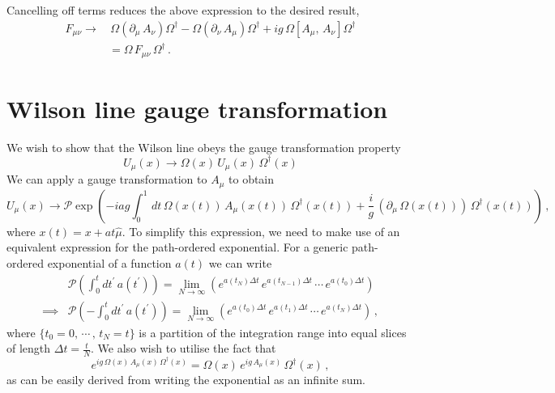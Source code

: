 Cancelling off terms reduces the above expression to the desired result,
%
\begin{align*}
F_{\mu\nu} \rightarrow &\, \Omega\left(\partial_\mu\,A_\nu\right)\Omega^\dagger - \Omega\left(\partial_\nu\,A_\mu\right)\Omega^\dagger +ig\,\Omega\left[A_\mu,\,A_\nu\right]\Omega^\dagger\\
&= \Omega\,F_{\mu\nu}\,\Omega^\dagger\, .
\end{align*}

\section{Wilson line gauge transformation}\label{app:WilsonLineGT}

We wish to show that the Wilson line obeys the gauge transformation property
%
\begin{equation}
U_\mu(x) \rightarrow \Omega(x)\,U_\mu(x)\,\Omega^\dagger(x)
\end{equation}
%
We can apply a gauge transformation to $A_\mu$ to obtain
%
\begin{equation}
U_\mu(x)\rightarrow\mathcal{P}\exp\left(-iag\int_0^1\,dt\, \Omega(x(t))\,A_\mu(x(t))\,\Omega^\dagger(x(t)) + \frac{i}{g}\,(\partial_\mu\,\Omega(x(t)))\,\Omega^\dagger(x(t))\right)\, ,
\label{eq:WilsonLineGT(app)}
\end{equation}
%
where $x(t)=x+at\hat{\mu}$. To simplify this expression, we need to make use of an equivalent expression for the path-ordered exponential. For a generic path-ordered exponential of a function $a(t)$ we can write
%
\begin{align}
&\mathcal{P}\left(\int_0^t dt^\prime\, a(t^\prime)\right) = \lim_{N\rightarrow\infty} \left( e^{a(t_N)\Delta t}\,e^{a(t_{N-1})\Delta t}\,\cdots\,e^{a(t_0)\Delta t}\right)\nonumber\\
\implies &\mathcal{P}\left(-\int_0^t dt^\prime\, a(t^\prime)\right) = \lim_{N\rightarrow\infty} \left( e^{a(t_0)\Delta t}\,e^{a(t_{1})\Delta t}\,\cdots\,e^{a(t_N)\Delta t}\right)\, , \label{eq:OrderedExponentialLimit}
\end{align}
%
where $\lbrace t_0 = 0, \, \cdots\, , \, t_N = t\rbrace$ is a partition of the integration range into equal slices of length $\Delta t = \frac{t}{N}$. We also wish to utilise the fact that
%
\begin{equation}
e^{ig\,\Omega(x)\,A_\mu(x)\,\Omega^\dagger(x)} = \Omega(x)\,e^{ig\,A_\mu(x)}\,\Omega^\dagger(x)\, ,
\end{equation}
as can be easily derived from writing the exponential as an infinite sum.\\

